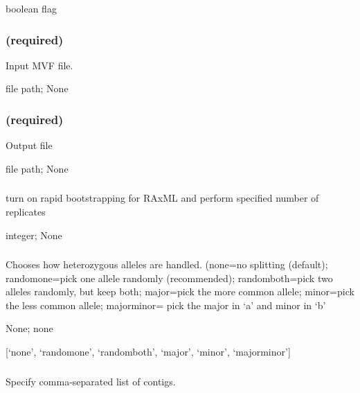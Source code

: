 \documentclass[letterpaper,11pt,english]{sphinxmanual}
\begin{document}
 boolean flag


\subsubsection{ (required)}
\label{\detokenize{prog_desc:id108}}
 Input MVF file.

 file path;  None


\subsubsection{ (required)}
\label{\detokenize{prog_desc:id109}}
 Output file

 file path;  None


\subsubsection{}
\label{\detokenize{prog_desc:bootstrap}}
 turn on rapid bootstrapping for RAxML and perform specified number of replicates

 integer;  None


\subsubsection{}
\label{\detokenize{prog_desc:choose-allele-chooseallele-hapmode}}
 Chooses how heterozygous alleles are handled. (none=no splitting (default); randomone=pick one allele randomly (recommended); randomboth=pick two alleles randomly, but keep both; major=pick the more common allele; minor=pick the less common allele; majorminor= pick the major in ‘a’ and minor in ‘b’

 None;  none

 {[}‘none’, ‘randomone’, ‘randomboth’, ‘major’, ‘minor’, ‘majorminor’{]}


\subsubsection{}
\label{\detokenize{prog_desc:id110}}
 Specify comma-separated list of contigs.
\end{document}
